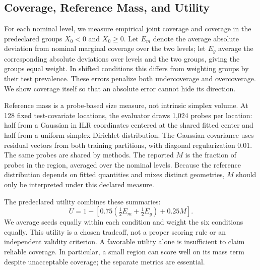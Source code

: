 \documentclass{article}
\begin{document}
\subsection{Coverage, Reference Mass, and Utility}
For each nominal level, we measure empirical joint coverage and coverage in the predeclared groups $X_0<0$ and $X_0\ge0$. Let $E_m$ denote the average absolute deviation from nominal marginal coverage over the two levels; let $E_g$ average the corresponding absolute deviations over levels and the two groups, giving the groups equal weight. In shifted conditions this differs from weighting groups by their test prevalence. These errors penalize both undercoverage and overcoverage. We show coverage itself so that an absolute error cannot hide its direction.

Reference mass is a probe-based size measure, not intrinsic simplex volume. At 128 fixed test-covariate locations, the evaluator draws 1,024 probes per location: half from a Gaussian in ILR coordinates centered at the shared fitted center and half from a uniform-simplex Dirichlet distribution. The Gaussian covariance uses residual vectors from both training partitions, with diagonal regularization 0.01. The same probes are shared by methods. The reported $M$ is the fraction of probes in the region, averaged over the nominal levels. Because the reference distribution depends on fitted quantities and mixes distinct geometries, $M$ should only be interpreted under this declared measure.

The predeclared utility combines these summaries:
\begin{equation}
 U=1-\left[0.75\left(\tfrac12 E_m+\tfrac12 E_g\right)+0.25M\right].
 \label{eq:utility}
\end{equation}
We average seeds equally within each condition and weight the six conditions equally. This utility is a chosen tradeoff, not a proper scoring rule or an independent validity criterion. A favorable utility alone is insufficient to claim reliable coverage. In particular, a small region can score well on its mass term despite unacceptable coverage; the separate metrics are essential.
\end{document}
